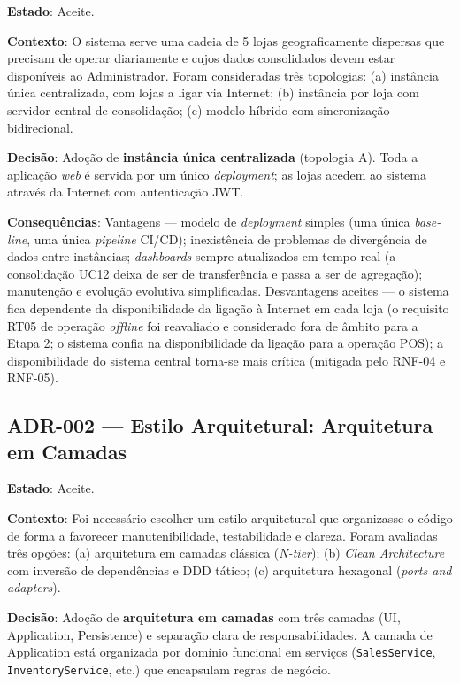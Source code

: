 \noindent\textbf{Estado}: Aceite.

\noindent\textbf{Contexto}: O sistema serve uma cadeia de 5 lojas geograficamente dispersas que precisam de operar diariamente e cujos dados consolidados devem estar disponíveis ao Administrador. Foram consideradas três topologias: (a) instância única centralizada, com lojas a ligar via Internet; (b) instância por loja com servidor central de consolidação; (c) modelo híbrido com sincronização bidirecional.

\noindent\textbf{Decisão}: Adoção de \textbf{instância única centralizada} (topologia A). Toda a aplicação \textit{web} é servida por um único \textit{deployment}; as lojas acedem ao sistema através da Internet com autenticação JWT.

\noindent\textbf{Consequências}: Vantagens --- modelo de \textit{deployment} simples (uma única \textit{base-line}, uma única \textit{pipeline} CI/CD); inexistência de problemas de divergência de dados entre instâncias; \textit{dashboards} sempre atualizados em tempo real (a consolidação UC12 deixa de ser de transferência e passa a ser de agregação); manutenção e evolução evolutiva simplificadas. Desvantagens aceites --- o sistema fica dependente da disponibilidade da ligação à Internet em cada loja (o requisito RT05 de operação \textit{offline} foi reavaliado e considerado fora de âmbito para a Etapa 2; o sistema confia na disponibilidade da ligação para a operação POS); a disponibilidade do sistema central torna-se mais crítica (mitigada pelo RNF-04 e RNF-05).

\subsection*{ADR-002 --- Estilo Arquitetural: Arquitetura em Camadas}

\noindent\textbf{Estado}: Aceite.

\noindent\textbf{Contexto}: Foi necessário escolher um estilo arquitetural que organizasse o código de forma a favorecer manutenibilidade, testabilidade e clareza. Foram avaliadas três opções: (a) arquitetura em camadas clássica (\textit{N-tier}); (b) \textit{Clean Architecture} com inversão de dependências e DDD tático; (c) arquitetura hexagonal (\textit{ports and adapters}).

\noindent\textbf{Decisão}: Adoção de \textbf{arquitetura em camadas} com três camadas (UI, Application, Persistence) e separação clara de responsabilidades. A camada de Application está organizada por domínio funcional em serviços (\texttt{SalesService}, \texttt{InventoryService}, etc.) que encapsulam regras de negócio.

